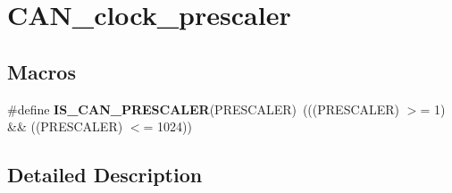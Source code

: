 \hypertarget{group___c_a_n__clock__prescaler}{}\section{C\+A\+N\+\_\+clock\+\_\+prescaler}
\label{group___c_a_n__clock__prescaler}
\subsection*{Macros}
\begin{DoxyCompactItemize}
\item 
\hypertarget{group___c_a_n__clock__prescaler_gacde6b8be6fe083a6302fc183b5ac1055}{}\#define {\bfseries I\+S\+\_\+\+C\+A\+N\+\_\+\+P\+R\+E\+S\+C\+A\+L\+E\+R}(P\+R\+E\+S\+C\+A\+L\+E\+R)~(((P\+R\+E\+S\+C\+A\+L\+E\+R) $>$= 1) \&\& ((P\+R\+E\+S\+C\+A\+L\+E\+R) $<$= 1024))\label{group___c_a_n__clock__prescaler_gacde6b8be6fe083a6302fc183b5ac1055}

\end{DoxyCompactItemize}


\subsection{Detailed Description}
